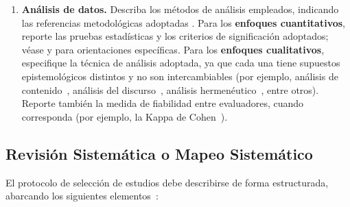 \documentclass[spanish]{rbie2026}%
\begin{document}
\begin{enumerate}
  \item \textbf{Análisis de datos.} Describa los métodos de análisis empleados, indicando las referencias metodológicas adoptadas \citep{creswell2023research}. Para los \textbf{enfoques cuantitativos}, reporte las pruebas estadísticas y los criterios de significación adoptados; véase \cite{mpcie_vol2_cap9_descritiva} y \cite{mpcie_vol2_cap10_inferencial} para orientaciones específicas. Para los \textbf{enfoques cualitativos}, especifique la técnica de análisis adoptada, ya que cada una tiene supuestos epistemológicos distintos y no son intercambiables (por ejemplo, análisis de contenido~\citep{mpcie_vol3_cap9_analise_conteudo}, análisis del discurso~\citep{mpcie_vol3_cap7_analise_discurso}, análisis hermenéutico~\citep{mpcie_vol3_cap8_analise_hermeneutica}, entre otros). Reporte también la medida de fiabilidad entre evaluadores, cuando corresponda (por ejemplo, la Kappa de Cohen~\citep{Cohen1960}).
\end{enumerate}


\subsection{Revisión Sistemática o Mapeo Sistemático}

El protocolo de selección de estudios debe describirse de forma estructurada, abarcando los siguientes elementos~\citep{Kitchenham2023_SEGRESS_supp, mpcie_vol2_cap3_rsl}:
\end{document}
